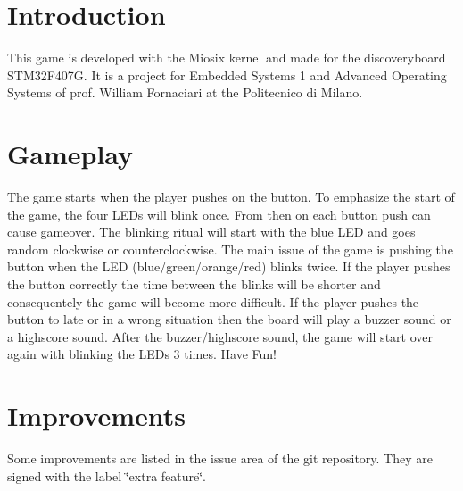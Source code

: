 \hypertarget{index_Introduction}{}\section{Introduction}\label{index_Introduction}
This game is developed with the Miosix kernel and made for the discoveryboard S\+T\+M32\+F407G. It is a project for Embedded Systems 1 and Advanced Operating Systems of prof. William Fornaciari at the Politecnico di Milano.\hypertarget{index_Gameplay}{}\section{Gameplay}\label{index_Gameplay}
The game starts when the player pushes on the button. To emphasize the start of the game, the four L\+ED\textquotesingle{}s will blink once. From then on each button push can cause gameover. The blinking ritual will start with the blue L\+ED and goes random clockwise or counterclockwise. The main issue of the game is pushing the button when the L\+ED (blue/green/orange/red) blinks twice. If the player pushes the button correctly the time between the blinks will be shorter and consequentely the game will become more difficult. If the player pushes the button to late or in a wrong situation then the board will play a buzzer sound or a highscore sound. After the buzzer/highscore sound, the game will start over again with blinking the L\+ED\textquotesingle{}s 3 times. Have Fun!\hypertarget{index_Improvements}{}\section{Improvements}\label{index_Improvements}
Some improvements are listed in the issue area of the git repository. They are signed with the label \char`\"{}extra feature\char`\"{}. 